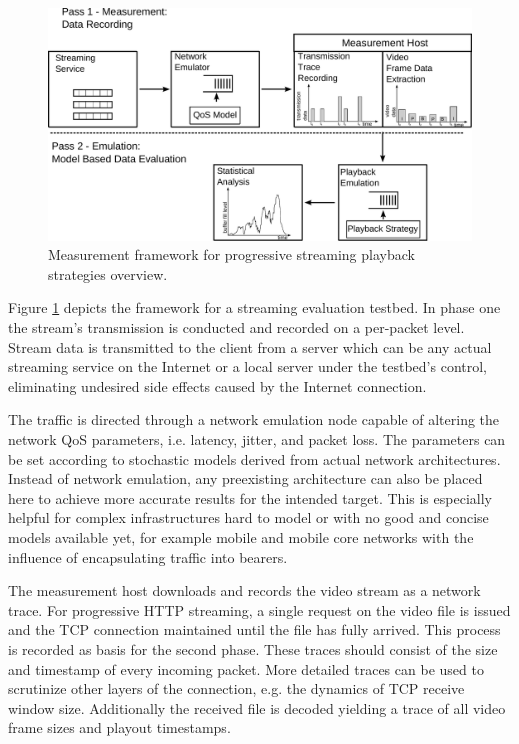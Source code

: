 \begin{figure}[htb]
    \includegraphics[width=\textwidth]{images/measurement-model.pdf}
    \caption{Measurement framework for progressive streaming playback strategies overview.}
    \label{c3:fig:framework}
\end{figure}

Figure \ref{c3:fig:framework} depicts the framework for a streaming evaluation testbed. In phase one the stream's transmission is conducted and recorded on a per-packet level. Stream data is transmitted to the client from a server which can be any actual streaming service on the Internet or a local server under the testbed's control, eliminating undesired side effects caused by the Internet connection. 

The traffic is directed through a network emulation node capable of altering the network \gls{QoS} parameters, i.e. latency, jitter, and packet loss. The parameters can be set according to stochastic models derived from actual network architectures. Instead of network emulation, any preexisting architecture can also be placed here to achieve more accurate results for the intended target. This is especially helpful for complex infrastructures hard to model or with no good and concise models available yet, for example mobile and mobile core networks with the influence of encapsulating traffic into bearers.

The measurement host downloads and records the video stream as a network trace. For progressive \gls{HTTP} streaming, a single request on the video file is issued and the \gls{TCP} connection maintained until the file has fully arrived.
This process is recorded as basis for the second phase. These traces should consist of the size and timestamp of every incoming packet. More detailed traces can be used to scrutinize other layers of the connection, e.g. the dynamics of TCP receive window size. Additionally the received file is decoded yielding a trace of all video frame sizes and playout timestamps.


